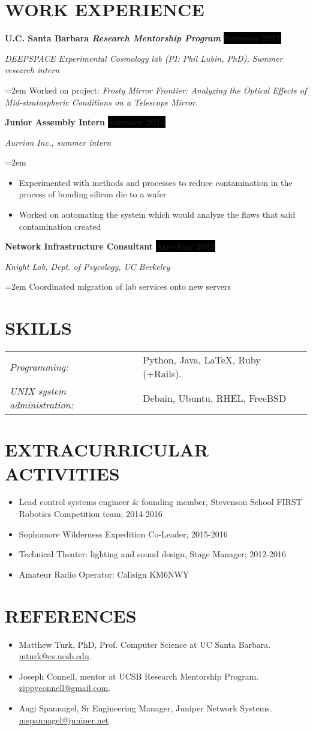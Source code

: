 \documentclass[paper=a4,fontsize=11pt]{scrartcl} %
\newcommand{\sepspace}{\vspace*{0.5em}}		%
\newcommand{\NewPart}[1]{\section*{\uppercase{#1}}}
\newcommand{\EducationEntry}[4]{
		\noindent \textbf{#1} \hfill      %
		\colorbox{Black}{%
			\parbox{6.5em}{%
			\hfill\color{White}\textbf{#2}}} \par  %
		\noindent \textit{#3} \par        %
		\noindent\hangindent=2em\hangafter=0 \small #4 %
		\normalsize \par}
\newcommand{\WorkEntry}[4]{				  %
		\noindent \textbf{#1} \hfill      %
		\colorbox{Black}{\color{White}\textbf{#2}} \par  %
		\noindent \textit{#3} \par              %
		\noindent\hangindent=2em\hangafter=0 \small #4 %
		\normalsize \par}
\begin{document}
\label{WORK}

\NewPart{Work experience}{}

\WorkEntry{U.C. Santa Barbara \textit{Research Mentorship Program}}{Summer 2015}{DEEPSPACE Experimental Cosmology lab (PI: Phil Lubin, PhD), Summer research intern}{Worked on project: \textit{Frosty Mirror Frontier: Analyzing the Optical Effects of Mid-stratospheric Conditions on a Telescope Mirror}.}
\sepspace

\WorkEntry{Junior Assembly Intern}{Summer 2014}{Aurrion Inc., summer intern}{\begin{itemize}\setlength\itemsep{0em}
		\item Experimented with methods and processes to reduce contamination in the process of bonding silicon die to a wafer
		\item Worked on automating the system which would analyze the flaws that said contamination created	\end{itemize} }
	
\WorkEntry{Network Infrastructure Consultant}{Apr-Aug 2017}{Knight Lab, Dept. of Psycology, UC Berkeley}{Coordinated migration of lab services onto new servers}



\label{SKILLS}
\NewPart{Skills}{}
\begin{tabular}{ll}
\textit{Programming:} & Python, Java, \LaTeX, Ruby (+Rails).\\
\textit{UNIX system administration:} & Debain, Ubuntu, RHEL, FreeBSD\\
\end{tabular}

\label{EXTRACUR}
\NewPart{Extracurricular Activities}{}
\begin{itemize}\setlength\itemsep{-.5em}
	\item Lead control systems engineer \& founding member, Stevenson School FIRST Robotics Competition team; 2014-2016
	\item Sophomore Wilderness Expedition Co-Leader; 2015-2016
	\item Technical Theater: lighting and sound design, Stage Manager; 2012-2016
	\item Amateur Radio Operator: Callsign KM6NWY
\end{itemize}

\label{REFERENCES}
\NewPart{References}{}
\begin{itemize}\setlength\itemsep{-.5em}
	\item Matthew Turk, PhD, Prof. Computer Science at UC Santa Barbara. \url{mturk@cs.ucsb.edu}.
	\item Joseph Connell, mentor at UCSB Research Mentorship Program. \url{zippyconnell@gmail.com}.
	\item Augi Spannagel, Sr Engineering Manager, Juniper Network Systems. \url{mspannagel@juniper.net}
\end{itemize}
\end{document}
